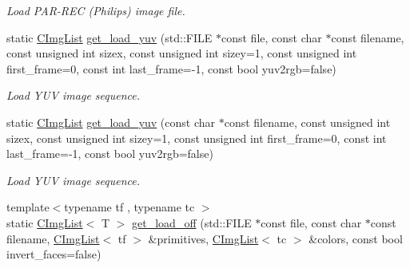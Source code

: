 \begin{DoxyCompactItemize}
\begin{DoxyCompactList}\small\item\em Load PAR-\/REC (Philips) image file. \item\end{DoxyCompactList}\item 
\hypertarget{structcimg__library_1_1_c_img_list_aaa8f85db981559732ebec48625f39724}{
static \hyperlink{structcimg__library_1_1_c_img_list}{CImgList} \hyperlink{structcimg__library_1_1_c_img_list_aaa8f85db981559732ebec48625f39724}{get\_\-load\_\-yuv} (std::FILE $\ast$const file, const char $\ast$const filename, const unsigned int sizex, const unsigned int sizey=1, const unsigned int first\_\-frame=0, const int last\_\-frame=-\/1, const bool yuv2rgb=false)}
\label{structcimg__library_1_1_c_img_list_aaa8f85db981559732ebec48625f39724}

\begin{DoxyCompactList}\small\item\em Load YUV image sequence. \item\end{DoxyCompactList}\item 
\hypertarget{structcimg__library_1_1_c_img_list_a818c284882bee7993cb003e0b5739686}{
static \hyperlink{structcimg__library_1_1_c_img_list}{CImgList} \hyperlink{structcimg__library_1_1_c_img_list_a818c284882bee7993cb003e0b5739686}{get\_\-load\_\-yuv} (const char $\ast$const filename, const unsigned int sizex, const unsigned int sizey=1, const unsigned int first\_\-frame=0, const int last\_\-frame=-\/1, const bool yuv2rgb=false)}
\label{structcimg__library_1_1_c_img_list_a818c284882bee7993cb003e0b5739686}

\begin{DoxyCompactList}\small\item\em Load YUV image sequence. \item\end{DoxyCompactList}\item 
\hypertarget{structcimg__library_1_1_c_img_list_ae7b63a914d821432d97b0986231c3246}{
{\footnotesize template$<$typename tf , typename tc $>$ }\\static \hyperlink{structcimg__library_1_1_c_img_list}{CImgList}$<$ T $>$ \hyperlink{structcimg__library_1_1_c_img_list_ae7b63a914d821432d97b0986231c3246}{get\_\-load\_\-off} (std::FILE $\ast$const file, const char $\ast$const filename, \hyperlink{structcimg__library_1_1_c_img_list}{CImgList}$<$ tf $>$ \&primitives, \hyperlink{structcimg__library_1_1_c_img_list}{CImgList}$<$ tc $>$ \&colors, const bool invert\_\-faces=false)}
\label{structcimg__library_1_1_c_img_list_ae7b63a914d821432d97b0986231c3246}


\end{DoxyCompactItemize}
